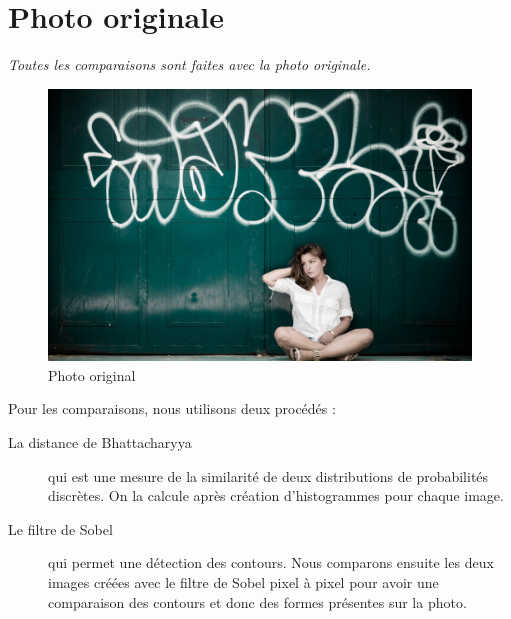 \section{Photo originale}\label{photo-originale}

\emph{Toutes les comparaisons sont faites avec la photo originale.}

\begin{figure}[htbp]
\centering
\includegraphics{../../photos/original.jpg}
\caption{Photo original}
\end{figure}

Pour les comparaisons, nous utilisons deux procédés :

\begin{description}
\item[La distance de Bhattacharyya] qui est une mesure de la similarité de deux
  distributions de probabilités discrètes. On la calcule après création
  d'histogrammes pour chaque image.
\item[Le filtre de Sobel] qui permet une détection des contours. Nous comparons
  ensuite les deux images créées avec le filtre de Sobel pixel à pixel pour
  avoir une comparaison des contours et donc des formes présentes sur la photo.
\end{description}
